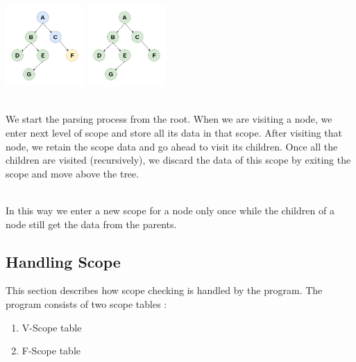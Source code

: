 \documentclass{article}
\begin{document}
\includegraphics[width=3cm]{8.jpg}
\includegraphics[width=3cm]{9.jpg}

~\\
We start the parsing process from the root. When we are visiting a node, we enter next level of scope and store all its data in that scope. After visiting that node, we retain the scope data and go ahead to visit its children. Once all the children are visited (recursively), we discard the data of this scope by exiting the scope and move above the tree.

~\\
In this way we enter a new scope for a node only once while the children of a node still get the data from the parents.

\subsection{Handling Scope}\label{handlingscope:f}
This section describes how scope checking is handled by the program. The program consists of two scope tables :
\begin{enumerate}
	\item V-Scope table
	\item F-Scope table
\end{enumerate}
\end{document}
